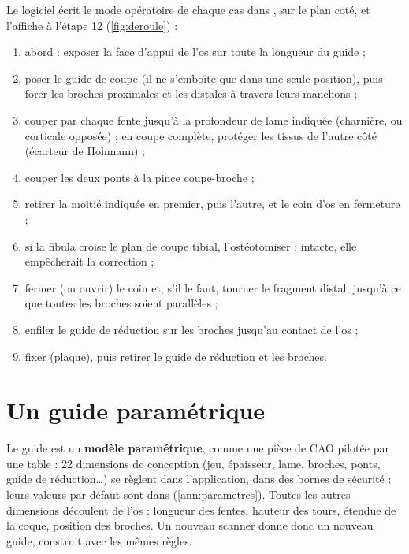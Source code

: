 Le logiciel écrit le mode opératoire de chaque cas dans , sur le plan coté, et l'affiche à
l'étape 12 (\cref{fig:deroule}) :
\begin{enumerate}
  \item abord : exposer la face d'appui de l'os sur toute la longueur du guide ;
  \item poser le guide de coupe (il ne s'emboîte que dans une seule position), puis forer les broches proximales et les
  distales à travers leurs manchons ;
  \item couper par chaque fente jusqu'à la profondeur de lame indiquée (charnière, ou corticale opposée) ; en coupe
  complète, protéger les tissus de l'autre côté (écarteur de Hohmann) ;
  \item couper les deux ponts à la pince coupe-broche ;
  \item retirer la moitié indiquée en premier, puis l'autre, et le coin d'os en fermeture ;
  \item si la fibula croise le plan de coupe tibial, l'ostéotomiser : intacte, elle empêcherait la correction ;
  \item fermer (ou ouvrir) le coin et, s'il le faut, tourner le fragment distal, jusqu'à ce que toutes les broches
  soient parallèles ;
  \item enfiler le guide de réduction sur les broches jusqu'au contact de l'os ;
  \item fixer (plaque), puis retirer le guide de réduction et les broches.
\end{enumerate}


\section{Un guide paramétrique}

Le guide est un \textbf{modèle paramétrique}, comme une pièce de CAO pilotée par une table : 22 dimensions de
conception (jeu, épaisseur, lame, broches, ponts, guide de réduction\ldots) se règlent dans l'application, dans des
bornes de sécurité ; leurs valeurs par défaut sont dans  (\cref{ann:parametres}). Toutes les
autres dimensions découlent de l'os : longueur des fentes, hauteur des tours, étendue de la coque, position des
broches. Un nouveau scanner donne donc un nouveau guide, construit avec les mêmes règles.

